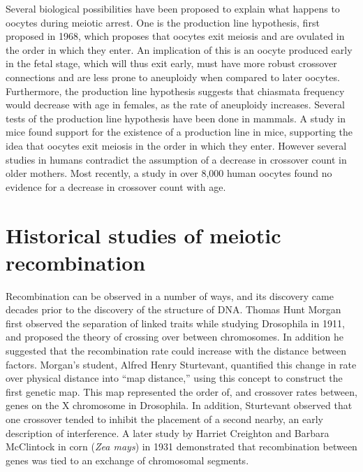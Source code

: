Several biological possibilities have been proposed to explain what happens to oocytes during meiotic arrest.
One is the production line hypothesis, first proposed in 1968\cite{Henderson1968}, which proposes that oocytes exit meiosis and are ovulated in the order in which they enter.
An implication of this is an oocyte produced early in the fetal stage, which will thus exit early, must have more robust crossover connections and are less prone to aneuploidy when compared to later oocytes.
Furthermore, the production line hypothesis suggests that chiasmata frequency would decrease with age in females, as the rate of aneuploidy increases.
Several tests of the production line hypothesis have been done in mammals.
A study in mice found support for the existence of a production line in mice\cite{Polani1991}, supporting the idea that oocytes exit meiosis in the order in which they enter.
However several studies in humans contradict the assumption of a decrease in crossover count in older mothers\cite{Kong2004,Martin2015}.
Most recently, a study in over 8,000 human oocytes found no evidence for a decrease in crossover count with age.




\section{Historical studies of meiotic recombination}

Recombination can be observed in a number of ways, and its discovery came decades prior to the discovery of the structure of DNA.
Thomas Hunt Morgan first observed the separation of linked traits while studying Drosophila in 1911\cite{Morgan1911}, and proposed the theory of crossing over between chromosomes.
In addition he suggested that the recombination rate could increase with the distance between factors.
Morgan's student, Alfred Henry Sturtevant, quantified this change in rate over physical distance into ``map distance,'' using this concept to construct the first genetic map.
This map represented the order of, and crossover rates between, genes on the X chromosome in Drosophila\cite{Sturtevant1913}.
In addition, Sturtevant observed that one crossover tended to inhibit the placement of a second nearby, an early description of interference.
A later study by Harriet Creighton and Barbara McClintock in corn (\textit{Zea mays}) in 1931 demonstrated that recombination between genes was tied to an exchange of chromosomal segments\cite{Creighton1931}.

